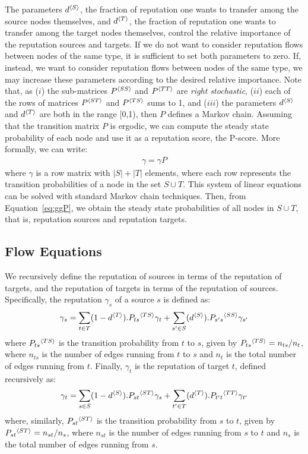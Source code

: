 \documentclass[notitlepage]{svjour3}
\begin{document}
The parameters $d{^{\langle S \rangle}}$, the fraction of reputation one wants to transfer among the source nodes themselves, 
and $d{^{\langle T \rangle}}$, the fraction of reputation one wants to transfer among the target nodes themselves,
control the relative importance of the reputation sources and targets. 
If we do not want to consider reputation flows between nodes of the same type, it is sufficient to set both parameters to zero. If, instead, we want to consider reputation flows between nodes of the same type, we may increase these parameters according to the desired relative importance. Note that, as ($i$) the sub-matrices $P{^{\langle SS \rangle}}$ and $P{^{\langle TT \rangle}}$ are \emph{right stochastic}, ($ii$) each of the rows of matrices $P{^{\langle ST \rangle}}$ and $P{^{\langle TS \rangle}}$ sums to 1, and ($iii$) the parameters $d{^{\langle S \rangle}}$ and $d{^{\langle T \rangle}}$ are both in the range [0,1), then $P$ defines a Markov chain. Assuming that the transition matrix $P$ is ergodic, we can compute the steady state probability of each node 
and use it as a reputation score, the P-score. 
More formally, we can write: 
\begin{align}
\label{eq:ggP}
\gamma = \gamma P
\end{align}
where $\gamma$ is a row matrix with $|S|+|T|$ elements, 
where each row represents the transition probabilities of a node in the set $S\cup T$. 
%
This system of linear equations can be solved with standard Markov chain techniques. %
Then, from Equation~\eqref{eq:ggP}, we obtain the steady state probabilities of all nodes in $S \cup T$, that is, reputation sources and reputation targets.

\subsection{Flow Equations}\label{sec:flow-equations}

We recursively define the reputation of sources in terms of the reputation of targets, and the reputation of targets in terms of the reputation of sources. Specifically, the reputation $\gamma_s$ of a source $s$ is defined as:
\begin{align}
  \gamma_s = \sum_{t \in T} (1-d{^{\langle T \rangle}}).P_{ts}{^{\langle TS \rangle}} \gamma_t + \sum_{s' \in S} (d{^{\langle S \rangle}}).P_{s's}{^{\langle SS \rangle}} \gamma_{s'}\label{eqn:gs}
\end{align}
where $P_{ts}{^{\langle TS \rangle}}$ is the transition probability from $t$ to $s$, given by $P_{ts}{^{\langle TS \rangle}} = n_{ts} / n_t$, where $n_{ts}$ is the number of edges running from $t$ to $s$ and $n_t$ is the total number of edges running from $t$. Finally, $\gamma_t$ is the reputation of target $t$, defined recursively as:
\begin{align}
  \gamma_t = \sum_{s \in S} (1-d{^{\langle S \rangle}}).P_{st}{^{\langle ST \rangle}} \gamma_s + \sum_{t' \in T} (d{^{\langle T \rangle}}).P_{t't}{^{\langle TT \rangle}} \gamma_{t'}\label{eqn:gt}
\end{align}
where, similarly, $P_{st}{^{\langle ST \rangle}}$ is the transition probability from $s$ to $t$, given by $P_{st}{^{\langle ST \rangle}} = n_{st} / n_s$, where $n_{st}$ is the number of edges running from $s$ to $t$ and $n_s$ is the total number of edges running from $s$. 
\end{document}
